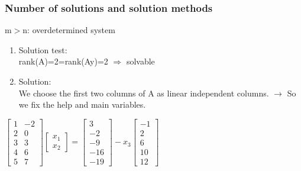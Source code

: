 \begin{frame}
	\frametitle{Number of solutions and solution methods}
	\begin{block}{m$>$n: overdetermined system}
		\begin{enumerate}
			\item Solution test:\\
			rank(A)=2=rank(Ay)=2 $\Rightarrow$ solvable
			\item Solution:\\
			We choose the first two columns of A as linear independent columns. $\rightarrow$ So we fix the help and main variables.
		\end{enumerate}
		$\begin{bmatrix}
		1 & -2\\
		2 & 0\\
		3 & 3\\
		4 & 6 \\
		5 & 7 
		\end{bmatrix}\begin{bmatrix}
		x_1\\x_2
		\end{bmatrix}=\begin{bmatrix}
		3\\-2\\-9\\-16\\-19
		\end{bmatrix}-x_3\begin{bmatrix}
		-1\\2\\6\\10\\12
		\end{bmatrix}$
	\end{block}
\end{frame}

